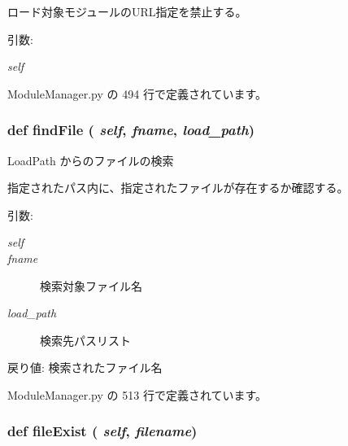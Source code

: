 ロード対象モジュールのURL指定を禁止する。

\begin{Desc}
\item[引数:]
\begin{description}
\item[{\em self}]\end{description}
\end{Desc}


 ModuleManager.py の 494 行で定義されています。
\subsubsection{\setlength{\rightskip}{0pt plus 5cm}def findFile ( {\em self},  {\em fname},  {\em load\_\-path})}\label{classsource__py_1_1_module_manager_1_1_module_manager_f78b60419496daa11bd36f70340c2eef}


LoadPath からのファイルの検索 

指定されたパス内に、指定されたファイルが存在するか確認する。

\begin{Desc}
\item[引数:]
\begin{description}
\item[{\em self}]\item[{\em fname}]検索対象ファイル名 \item[{\em load\_\-path}]検索先パスリスト\end{description}
\end{Desc}
\begin{Desc}
\item[戻り値:]検索されたファイル名 \end{Desc}


 ModuleManager.py の 513 行で定義されています。
\subsubsection{\setlength{\rightskip}{0pt plus 5cm}def fileExist ( {\em self},  {\em filename})}\label{classsource__py_1_1_module_manager_1_1_module_manager_775471182727b4e03b9ec4b20b11f754}



